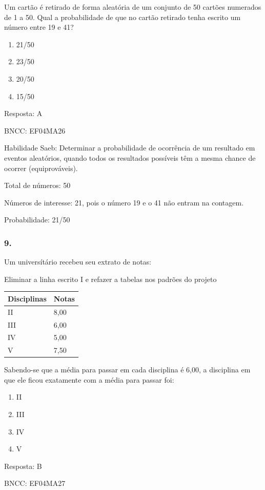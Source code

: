 Um cartão é retirado de forma aleatória de um conjunto de 50 cartões
numerados de 1 a 50. Qual a probabilidade de que no cartão retirado
tenha escrito um número entre 19 e 41?

\begin{enumerate}
\def\labelenumi{\alph{enumi})}
\item
  21/50
\item
  23/50
\item
  20/50
\item
  15/50
\end{enumerate}

Resposta: A

BNCC: EF04MA26

Habilidade Saeb: Determinar a probabilidade de ocorrência de um
resultado em eventos aleatórios, quando todos os resultados possíveis
têm a mesma chance de ocorrer (equiprováveis).

Total de números: 50

Números de interesse: 21, pois o número 19 e o 41 não entram na
contagem.

Probabilidade: 21/50

\subsubsection{9.}\label{section-180}

Um universítário recebeu seu extrato de notas:

Eliminar a linha escrito I e refazer a tabelas nos padrões do projeto

\begin{longtable}[]{@{}ll@{}}
\toprule
Disciplinas & Notas\tabularnewline
\midrule
\endhead
II & 8,00\tabularnewline
III & 6,00\tabularnewline
IV & 5,00\tabularnewline
V & 7,50\tabularnewline
\bottomrule
\end{longtable}

Sabendo-se que a média para passar em cada disciplina é 6,00, a
disciplina em que ele ficou exatamente com a média para passar foi:

\begin{enumerate}
\def\labelenumi{\alph{enumi})}
\item
  II
\item
  III
\item
  IV
\item
  V
\end{enumerate}

Resposta: B

BNCC: EF04MA27

